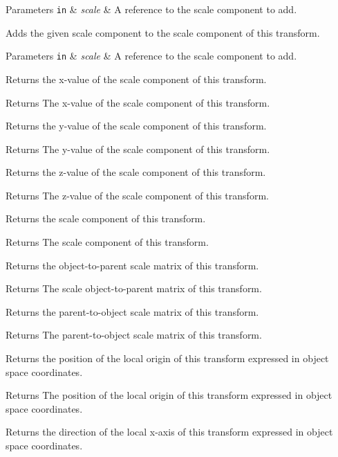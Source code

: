 \begin{DoxyParams}[1]{Parameters}
\mbox{\tt in}  & {\em scale} & A reference to the scale component to add.\\
\hline
\end{DoxyParams}
Adds the given scale component to the scale component of this transform.


\begin{DoxyParams}[1]{Parameters}
\mbox{\tt in}  & {\em scale} & A reference to the scale component to add.\\
\hline
\end{DoxyParams}
Returns the x-\/value of the scale component of this transform.

\begin{DoxyReturn}{Returns}
The x-\/value of the scale component of this transform.
\end{DoxyReturn}
Returns the y-\/value of the scale component of this transform.

\begin{DoxyReturn}{Returns}
The y-\/value of the scale component of this transform.
\end{DoxyReturn}
Returns the z-\/value of the scale component of this transform.

\begin{DoxyReturn}{Returns}
The z-\/value of the scale component of this transform.
\end{DoxyReturn}
Returns the scale component of this transform.

\begin{DoxyReturn}{Returns}
The scale component of this transform.
\end{DoxyReturn}
Returns the object-\/to-\/parent scale matrix of this transform.

\begin{DoxyReturn}{Returns}
The scale object-\/to-\/parent matrix of this transform.
\end{DoxyReturn}
Returns the parent-\/to-\/object scale matrix of this transform.

\begin{DoxyReturn}{Returns}
The parent-\/to-\/object scale matrix of this transform.
\end{DoxyReturn}
Returns the position of the local origin of this transform expressed in object space coordinates.

\begin{DoxyReturn}{Returns}
The position of the local origin of this transform expressed in object space coordinates.
\end{DoxyReturn}
Returns the direction of the local x-\/axis of this transform expressed in object space coordinates.

